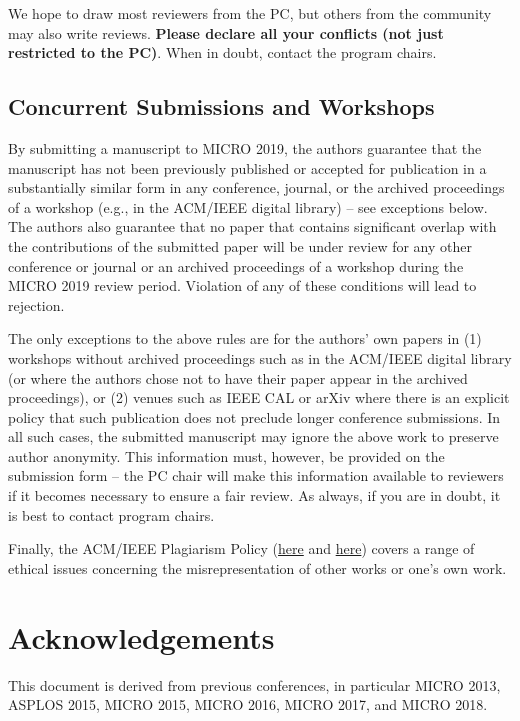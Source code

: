 \documentclass{sig-alternate}
\begin{document}
We hope to draw most reviewers from the PC, but others from the community may also write reviews.  {\bf Please declare all your conflicts (not just restricted to the PC)}.  When in doubt, contact the program chairs.


\subsection{Concurrent Submissions and Workshops}

By submitting a manuscript to MICRO 2019, the authors guarantee that the manuscript has not been previously published or accepted for publication in a substantially similar form in any conference, journal, or the archived proceedings of a workshop (e.g., in the ACM/IEEE digital library) -- see exceptions below. The authors also guarantee that no paper that contains significant overlap with the contributions of the submitted paper will be under review for any other conference or journal or an archived proceedings of a workshop during the MICRO 2019 review period. Violation of any of these conditions will lead to rejection.

The only exceptions to the above rules are for the authors' own papers in (1) workshops without archived proceedings such as in the ACM/IEEE digital library (or where the authors chose not to have their paper appear in the archived proceedings), or (2) venues such as IEEE CAL or arXiv where there is an explicit policy that such publication does not preclude longer conference submissions.  In all such cases, the submitted manuscript may ignore the above work to preserve author anonymity. This information must, however, be provided on the submission form -- the PC chair will make this information available to reviewers if it becomes necessary to ensure a fair review.  As always, if you are in doubt, it is best to contact program chairs.


Finally, the ACM/IEEE Plagiarism Policy (\href{http://www.acm.org/publications/policies/plagiarism_policy}{here} and \href{https://www.ieee.org/publications_standards/publications/rights/plagiarism_FAQ.html}{here}) covers a range of ethical issues concerning the misrepresentation of other works or one's own work.

\section*{Acknowledgements}
This document is derived from previous conferences, in particular MICRO 2013, ASPLOS 2015, MICRO 2015, MICRO 2016, MICRO 2017, and MICRO 2018.






\end{document}
